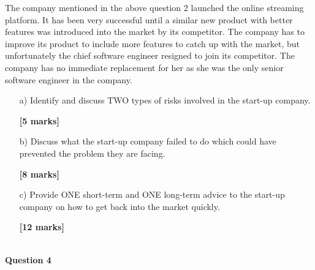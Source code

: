 \documentclass[11pt]{article}
\begin{document}
          The company mentioned in the above question 2 launched the online streaming platform. It has been very successful until a similar new product with better features was introduced into the market by its competitor. The company has to improve its product to include more features to catch up with the market, but unfortunately the chief software engineer resigned to join its competitor. The company has no immediate replacement for her as she was the only senior software engineer in the company.
        \begin{enumerate}
            
        \item[a) ]Identify and discuss TWO types of risks involved in the start-up company.
        \begin{flushright}
            \textbf{[5 marks]}
        \end{flushright}
    
        \item[b) ]Discuss what the start-up company failed to do which could have prevented the problem they are facing.
        \begin{flushright}
            \textbf{[8 marks]}
        \end{flushright}
    
        \item[c) ]Provide ONE short-term and ONE long-term advice to the start-up company on how to get back into the market quickly.
        \begin{flushright}
            \textbf{[12 marks]}
        \end{flushright}
    
        \end{enumerate}
        ~\\
    
        \textbf{Question 4}
\end{document}
